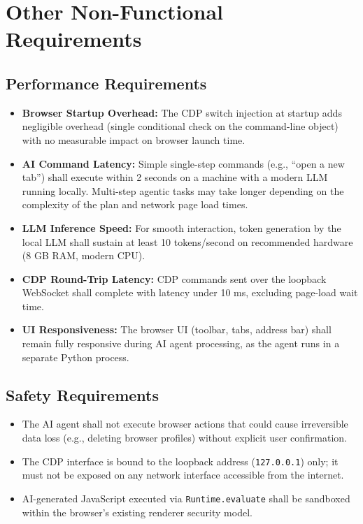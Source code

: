 \chapter{Other Non-Functional Requirements}

\section{Performance Requirements}
\begin{itemize}[leftmargin=*]
    \item \textbf{Browser Startup Overhead:} The CDP switch injection at startup adds negligible overhead (single conditional check on the command-line object) with no measurable impact on browser launch time.
    \item \textbf{AI Command Latency:} Simple single-step commands (e.g., ``open a new tab'') shall execute within 2 seconds on a machine with a modern LLM running locally. Multi-step agentic tasks may take longer depending on the complexity of the plan and network page load times.
    \item \textbf{LLM Inference Speed:} For smooth interaction, token generation by the local LLM shall sustain at least 10 tokens/second on recommended hardware (8 GB RAM, modern CPU).
    \item \textbf{CDP Round-Trip Latency:} CDP commands sent over the loopback WebSocket shall complete with latency under 10 ms, excluding page-load wait time.
    \item \textbf{UI Responsiveness:} The browser UI (toolbar, tabs, address bar) shall remain fully responsive during AI agent processing, as the agent runs in a separate Python process.
\end{itemize}

\section{Safety Requirements}
\begin{itemize}[leftmargin=*]
    \item The AI agent shall not execute browser actions that could cause irreversible data loss (e.g., deleting browser profiles) without explicit user confirmation.
    \item The CDP interface is bound to the loopback address (\texttt{127.0.0.1}) only; it must not be exposed on any network interface accessible from the internet.
    \item AI-generated JavaScript executed via \texttt{Runtime.evaluate} shall be sandboxed within the browser's existing renderer security model.
\end{itemize}

